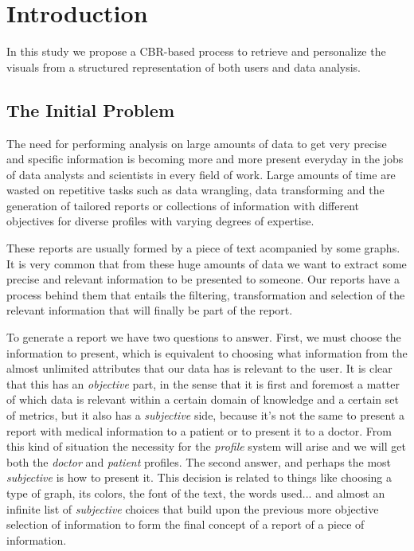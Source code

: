 %
%

\chapter{Introduction}

\begin{resumen}
In this study we propose a CBR-based process to retrieve and personalize the visuals from a structured representation of both users and data analysis.
\end{resumen}
\linespread{1.6}

\section{The Initial Problem}
\label{cap1:sec:problem}

The need for performing analysis on large amounts of data to get very precise and specific information is becoming more and more present everyday in the jobs of data analysts and scientists in every field of work.
Large amounts of time are wasted on repetitive tasks such as data wrangling, data transforming and the generation of tailored reports or collections of information with different objectives for diverse profiles with varying degrees of expertise.

These reports are usually formed by a piece of text acompanied by some graphs. 
It is very common that from these huge amounts of data we want to extract some precise and relevant information to be presented to someone. 
Our reports have a process behind them that entails the filtering, transformation and selection of the relevant information that will finally be part of the report.

To generate a report we have two questions to answer. First, we must choose the information to present, which is equivalent to choosing what information from the almost unlimited attributes that our data has is relevant to the user. 
It is clear that this has an \textit{objective} part, in the sense that it is first and foremost a matter of which data is relevant within a certain domain of knowledge and a certain set of metrics, but it also has a \textit{subjective} side, because it's not the same to present a report with medical information to a patient or to present it to a doctor. From this kind of situation the necessity for the \textit{profile} system will arise and we will get both the \textit{doctor} and \textit{patient} profiles.
The second answer, and perhaps the most \textit{subjective} is how to present it. This decision is related to things like choosing a type of graph, its colors, the font of the text, the words used... and almost an infinite list of \textit{subjective} choices that build upon the previous more objective selection of information to form the final concept of a report of a piece of information.

